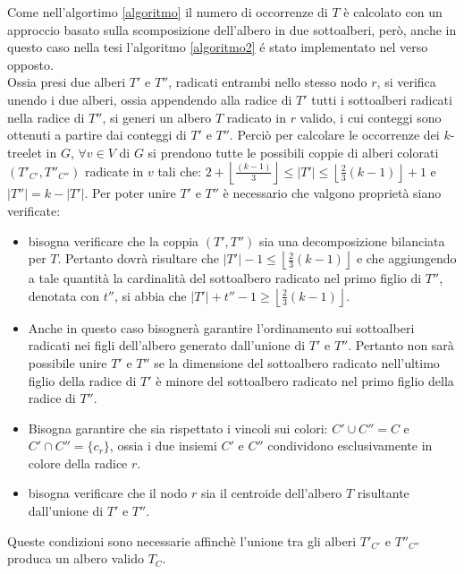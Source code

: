 Come nell'algortimo \ref{algoritmo} il numero di occorrenze di $ T $ è calcolato con un approccio basato sulla scomposizione dell'albero in due sottoalberi,  per\`o, anche in questo caso nella tesi l'algoritmo \ref{algoritmo2} \'e stato implementato nel verso opposto.\\
Ossia presi due alberi $ T' $ e $ T'' $, radicati entrambi nello stesso nodo $ r $, si verifica unendo i due alberi, ossia appendendo alla radice di $ T' $ tutti i sottoalberi radicati nella radice di $ T'' $, si generi un albero $ T $ radicato in $ r $ valido, i cui conteggi sono ottenuti a partire dai conteggi di $ T' $ e $ T'' $. 
Perci\`o per calcolare le occorrenze dei $ k $-treelet in $ G $, $ \forall v \in V $ di $ G $ si prendono tutte le possibili coppie di alberi colorati $ (T'_{C'}, T''_{C''} )$ radicate in $ v $ tali che: $ 2+ \left\lfloor \frac{(k-1)}{3}  \right\rfloor \le |T'| \le \left\lfloor \frac{2}{3}(k-1) \right\rfloor  +1 $ e $ |T''| = k-|T'| $.
Per poter unire $T'$ e $T''$ è necessario che valgono proprietà siano verificate: 
\begin{itemize}
	\label{prova}
	\item bisogna verificare che la coppia $ (T',T'') $ sia una decomposizione bilanciata per $ T $.
	Pertanto dovr\`a risultare che $ |T'| - 1 \le \left\lfloor\frac{2}{3}(k-1)\right\rfloor $ e che aggiungendo a tale quantit\`a la cardinalit\`a del sottoalbero radicato nel primo figlio di $ T'' $, denotata con $ t'' $, si abbia che $ |T'| + t'' - 1 \ge \left\lfloor\frac{2}{3}(k-1)\right\rfloor $.
	\item Anche in questo caso bisogner\`a garantire l'ordinamento sui sottoalberi radicati nei figli dell'albero generato dall'unione di $ T' $ e $ T'' $.
	Pertanto non sar\`a possibile unire $ T' $ e $ T'' $ se la dimensione del sottoalbero radicato nell'ultimo figlio della radice di $ T' $ \`e minore del sottoalbero radicato nel primo figlio della radice di $ T'' $.
	\item Bisogna garantire che sia rispettato i vincoli sui colori: $C' \cup C'' = C$ e $ C' \cap C'' = \{c_r\}$, ossia i due insiemi $C'$ e $C''$ condividono esclusivamente in colore della radice $ r $.
	\item bisogna verificare che il nodo $ r $ sia il centroide dell'albero $ T $ risultante dall'unione di $ T' $ e $ T'' $. 
\end{itemize}
Queste condizioni sono necessarie affinch\`e l'unione tra gli alberi $ T'_{C'} $ e $ T''_{C''} $ produca un albero valido $ T_C $.

